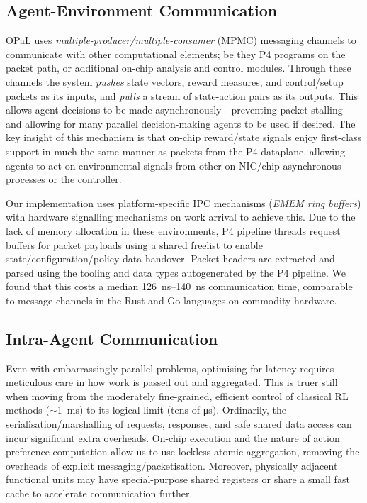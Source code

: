 \documentclass[sigconf,natbib=false]{acmart}
\newcommand{\approachshort}{OPaL}
\begin{document}
\subsection{Agent-Environment Communication}\label{sec:agent-environment-communication}
\approachshort{} uses \emph{multiple-producer/multiple-consumer} (MPMC) messaging channels to communicate with other computational elements; be they P4 programs on the packet path, or additional on-chip analysis and control modules.
Through these channels the system \emph{pushes} state vectors, reward measures, and control/setup packets as its inputs, and \emph{pulls} a stream of state-action pairs as its outputs.
This allows agent decisions to be made asynchronously---preventing packet stalling---and allowing for many parallel decision-making agents to be used if desired.
The key insight of this mechanism is that on-chip reward/state signals enjoy first-class support in much the same manner as packets from the P4 dataplane, allowing agents to act on environmental signals from other on-NIC/chip asynchronous processes or the controller.

Our implementation uses platform-specific IPC mechanisms (\emph{EMEM ring buffers}) with hardware signalling mechanisms on work arrival to achieve this.
Due to the lack of memory allocation in these environments, P4 pipeline threads request buffers for packet payloads using a shared freelist to enable state/configuration/policy data handover.
Packet headers are extracted and parsed using the tooling and data types autogenerated by the P4 pipeline.
We found that this costs a median \SIrange{126}{140}{\nano\second} communication time, comparable to message channels in the Rust and Go languages on commodity hardware.

\subsection{Intra-Agent Communication}
Even with embarrassingly parallel problems, optimising for latency requires meticulous care in how work is passed out and aggregated.
This is truer still when moving from the moderately fine-grained, efficient control of classical RL methods ($\sim$\SI{1}{\milli\second}) to its logical limit (tens of \si{\micro\second}).
Ordinarily, the serialisation/marshalling of requests, responses, and safe shared data access can incur significant extra overheads.
On-chip execution and the nature of action preference computation allow us to use lockless atomic aggregation, removing the overheads of explicit messaging/packetisation.
Moreover, physically adjacent functional units may have special-purpose shared registers or share a small fast cache to accelerate communication further.
\end{document}
